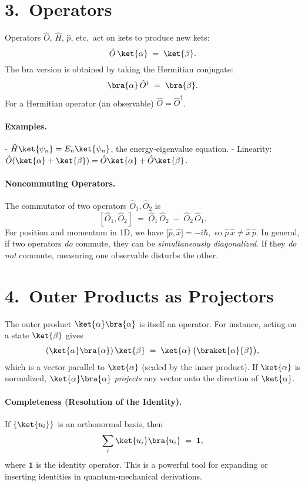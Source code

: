 \section*{3.\ Operators}

Operators $\hat{O}$, $\hat{H}$, $\hat{p}$, etc.\ act on kets to produce new kets:
\[
\hat{O}\,\ket{\alpha} 
\;=\;
\ket{\beta}.
\]
The bra version is obtained by taking the Hermitian conjugate:
\[
\bra{\alpha}\,\hat{O}^\dagger 
\;=\;
\bra{\beta}.
\]
For a Hermitian operator (an observable) $\hat{O} = \hat{O}^\dagger$. 

\paragraph{Examples.}
- $\hat{H}\ket{\psi_n} = E_n \ket{\psi_n}$, the energy‐eigenvalue equation.  
- Linearity: \(\hat{O}(\ket{\alpha}+\ket{\beta}) = \hat{O}\ket{\alpha} + \hat{O}\ket{\beta}\).  

\paragraph{Noncommuting Operators.}
The commutator of two operators $\hat{O}_1, \hat{O}_2$ is
\[
[\hat{O}_1, \hat{O}_2]
\;=\;
\hat{O}_1\,\hat{O}_2 
\;-\; 
\hat{O}_2\,\hat{O}_1.
\]
For position and momentum in 1D, we have 
\(
\bigl[\hat{p}, \hat{x}\bigr] = -i\hbar,
\)
so $\hat{p}\,\hat{x} \neq \hat{x}\,\hat{p}$.  In general, if two operators \emph{do} commute, they can be \emph{simultaneously diagonalized}.  If they \emph{do not} commute, measuring one observable disturbs the other.

\section*{4.\ Outer Products as Projectors}

The outer product \(\ket{\alpha}\bra{\alpha}\) is itself an operator.  For instance, acting on a state \(\ket{\beta}\) gives
\[
(\ket{\alpha}\bra{\alpha})\,\ket{\beta}
\;=\;
\ket{\alpha}\,\bigl(\braket{\alpha}{\beta}\bigr),
\]
which is a vector parallel to $\ket{\alpha}$ (scaled by the inner product).  If $\ket{\alpha}$ is normalized, \(\ket{\alpha}\bra{\alpha}\) \emph{projects} any vector onto the direction of $\ket{\alpha}$.

\paragraph{Completeness (Resolution of the Identity).}
If $\{\ket{u_i}\}$ is an orthonormal basis, then
\[
\sum_{i}\ket{u_i}\bra{u_i} 
\;=\;
\mathbf{1},
\]
where $\mathbf{1}$ is the identity operator.  This is a powerful tool for expanding or inserting identities in quantum‐mechanical derivations.
